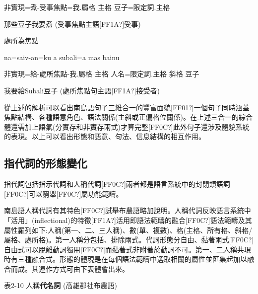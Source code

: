  \textrm{非實現=煮-受事焦點=我.屬格  主格  豆子=限定詞.主格}

 \textrm{那些豆子我要煮 (受事焦點主語[FF1A?]受事)}

\rmfamily
處所為焦點

\begin{listWWviiiNumviiileveli}
\item \begin{styleqwerty}\rmfamily
na=saiv-an=ku  a  subali=a  mas  bainu
\end{styleqwerty}
\end{listWWviiiNumviiileveli}

 \textrm{非實現=給-處所焦點{}-我.屬格  主格  人名=限定詞.主格  斜格  豆子}

 \textrm{我要給Subali豆子 (處所焦點句主語[FF1A?]接受者)}

\textrm{從上述的解析可以看出南島語句子三維合一的豐富面貌[FF01?]一個句子同時涵蓋焦點結構、各種語意角色、語法關係(主斜或正偏格位關係)}。\textrm{在上述三合一的綜合體還需加上語氣(分實存和非實存兩式)才算完整[FF0C?]此外句子還涉及體貌系統的表現。以上可以看出形態和語意、句法、信息結構的相互作用。}

\subsection{\textrm{指代詞的形態變化}}

\textrm{指代詞包括指示代詞和人稱代詞[FF0C?]兩者都是語言系統中的封閉類語詞[FF0C?]可以窮舉[FF0C?]屬功能範疇。}

\textrm{南島語人稱代詞有其特色[FF0C?]試舉布農語略加說明。人稱代詞反映語言系統中「活用」(inflectional)的特徵[FF1A?]活用即語法範疇的融合[FF0C?]語法範疇及其屬性羅列如下:人稱(第一、二、三人稱)、數(單、複數)}、\textrm{格(主格、所有格、斜格/屬格、處所格)}。\textrm{第一人稱分包括、排除兩式。代詞形態分自由、黏著兩式[FF0C?]自由式可以脫離動詞獨用[FF0C?]而黏著式非附著於動詞不可。第一、二人稱共現時有三種融合式。形態的體現是在每個語法範疇中選取相關的屬性並匯集起加以融合而成。其運作方式可由下表體會出來。}

\textrm{表2-10 人稱}\textrm{\textbf{代名詞} (}高雄郡社布農語)

\tablefirsthead{}

